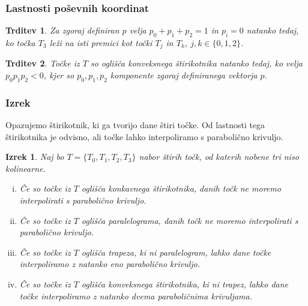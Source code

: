 \documentclass{beamer}
\newtheorem{izrek}{Izrek}
\newtheorem{trditev}{Trditev}
\begin{document}

\begin{frame}

\frametitle{Lastnosti poševnih koordinat}

\begin{trditev}\label{vektorp}
Za zgoraj definiran $p$ velja $p_0 + p_1 + p_2 = 1$ in $p_i = 0$ natanko tedaj, ko točka $T_3$ leži na isti premici kot točki $T_j$ in $T_k$, $j, k \in \{0, 1, 2 \}$. 
\end{trditev}

\begin{trditev}\label{konveks}
Točke iz $T$ so oglišča konveksnega štirikotnika natanko tedaj, ko velja $p_0 p_1 p_2 < 0$, kjer so $p_0, p_1, p_2$ komponente zgoraj definiranega vektorja $p$.
\end{trditev}

\end{frame}


\begin{frame}
\frametitle{Izrek}

Opazujemo štirikotnik, ki ga tvorijo dane štiri točke. Od lastnosti tega štirikotnika je odvisno, ali točke lahko interpoliramo s parabolično krivuljo.

\begin{izrek}
Naj bo $T = \{ T_0, T_1, T_2, T_3 \}$ nabor štirih točk, od katerih nobene tri niso kolinearne.

\begin{enumerate}[i)]
\item Če so točke iz $T$ oglišča konkavnega štirikotnika, danih točk ne moremo interpolirati s parabolično krivuljo.
\item Če so točke iz $T$ oglišča paralelograma, danih točk ne moremo interpolirati s parabolično krivuljo.
\item Če so točke iz $T$ oglišča trapeza, ki ni paralelogram, lahko dane točke interpoliramo z natanko eno parabolično krivuljo.
\item Če so točke iz $T$ oglišča konveksnega štirikotnika, ki ni trapez, lahko dane točke interpoliramo z natanko dvema paraboličnima krivuljama.
\end{enumerate}

\end{izrek}

\end{frame}
\end{document}
